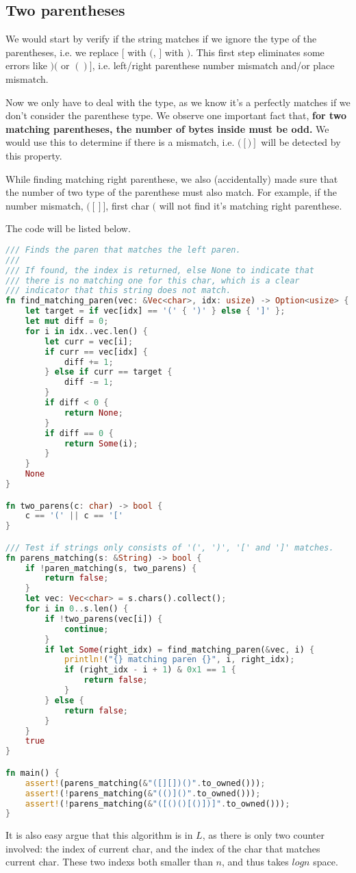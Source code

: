 \subsection*{Two parentheses}

We would start by verify if the string matches if we ignore the type of the parentheses, i.e. we replace $[$ with $($, $]$ with $)$.
This first step eliminates some errors like $)($ or $()]$, i.e. left/right parenthese number mismatch and/or place mismatch.

Now we only have to deal with the type, as we know it's a perfectly matches if we don't consider the parenthese type.
We observe one important fact that, \textbf{for two matching parentheses, the number of bytes inside must be odd.}
We would use this to determine if there is a mismatch, i.e. $([)]$ will be detected by this property.

While finding matching right parenthese, we also (accidentally) made sure that the number of two type of the parenthese must also match.
For example, if the number mismatch, $([]]$, first char $($ will not find it's matching right parenthese.

The code will be listed below.

\begin{lstlisting}[language=Rust]
/// Finds the paren that matches the left paren.
///
/// If found, the index is returned, else None to indicate that
/// there is no matching one for this char, which is a clear
/// indicator that this string does not match.
fn find_matching_paren(vec: &Vec<char>, idx: usize) -> Option<usize> {
    let target = if vec[idx] == '(' { ')' } else { ']' };
    let mut diff = 0;
    for i in idx..vec.len() {
        let curr = vec[i];
        if curr == vec[idx] {
            diff += 1;
        } else if curr == target {
            diff -= 1;
        }
        if diff < 0 {
            return None;
        }
        if diff == 0 {
            return Some(i);
        }
    }
    None
}

fn two_parens(c: char) -> bool {
    c == '(' || c == '['
}

/// Test if strings only consists of '(', ')', '[' and ']' matches.
fn parens_matching(s: &String) -> bool {
    if !paren_matching(s, two_parens) {
        return false;
    }
    let vec: Vec<char> = s.chars().collect();
    for i in 0..s.len() {
        if !two_parens(vec[i]) {
            continue;
        }
        if let Some(right_idx) = find_matching_paren(&vec, i) {
            println!("{} matching paren {}", i, right_idx);
            if (right_idx - i + 1) & 0x1 == 1 {
                return false;
            }
        } else {
            return false;
        }
    }
    true
}

fn main() {
    assert!(parens_matching(&"([][])()".to_owned()));
    assert!(!parens_matching(&"(()]()".to_owned()));
    assert!(!parens_matching(&"([()()[()])]".to_owned()));
}
\end{lstlisting}

It is also easy argue that this algorithm is in $L$, as there is only two counter involved:
the index of current char, and the index of the char that matches current char.
These two indexs both smaller than $n$, and thus takes $log n$ space.


